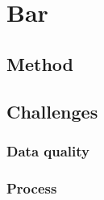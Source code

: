 
\chapter{Bar}\label{chap:bar}

\section{Method}
\lipsum[33-35]

\section{Challenges}
\lipsum[36-40]

\subsection*{Data quality}
\lipsum[41-42]

\subsection*{Process}
\lipsum[43-45]
